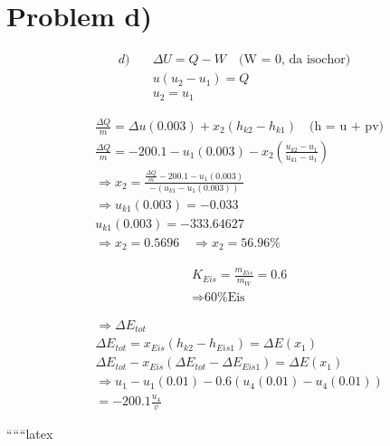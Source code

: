 \section*{Problem d)}

\begin{align*}

d) \quad & \Delta U = Q - W \quad \text{(W = 0, da isochor)} \\
& u \left( u_2 - u_1 \right) = Q \\
& u_2 = u_1
\end{align*}

\begin{align*}
& \frac{\Delta Q}{m} = \Delta u \left( 0.003 \right) + x_2 \left( h_{k2} - h_{k1} \right) \quad \text{(h = u + pv)} \\
& \frac{\Delta Q}{m} = -200.1 - u_1 \left( 0.003 \right) - x_2 \left( \frac{u_{k2} - u_1}{u_{k1} - u_1} \right) \\
& \Rightarrow x_2 = \frac{\frac{\Delta Q}{m} - 200.1 - u_1 \left( 0.003 \right)}{- \left( u_{k1} - u_1 \left( 0.003 \right) \right)} \\
& \Rightarrow u_{k1} \left( 0.003 \right) = -0.033 \\
& u_{k1} \left( 0.003 \right) = -333.64627 \\
& \Rightarrow x_2 = 0.5696 \quad \Rightarrow x_2 = 56.96\%
\end{align*}

\begin{align*}
& K_{Eis} = \frac{m_{Eis}}{m_{W}} = 0.6 \\
& \Rightarrow \text{60\% Eis}
\end{align*}

\begin{align*}
& \Rightarrow \Delta E_{tot} \\
& \Delta E_{tot} = x_{Eis} \left( h_{k2} - h_{Eis1} \right) = \Delta E \left( x_1 \right) \\
& \Delta E_{tot} - x_{Eis} \left( \Delta E_{tot} - \Delta E_{Eis1} \right) = \Delta E \left( x_1 \right) \\
& \Rightarrow u_1 - u_1 \left( 0.01 \right) - 0.6 \left( u_4 \left( 0.01 \right) - u_4 \left( 0.01 \right) \right) \\
& = -200.1 \frac{u_4}{v}
\end{align*}

``````latex